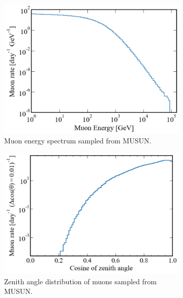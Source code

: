 \begin{figure}[htbp]
    \centering
    \begin{subfigure}[b]{0.48\textwidth}
        \centering
        \includegraphics[width=\textwidth]{figures/Muons/Primary_energyLZstyle.pdf}
        \caption{Muon energy spectrum sampled from MUSUN.}
        \label{fig:Muons/Prim_E}
    \end{subfigure}
    \begin{subfigure}[b]{0.49\textwidth}  
        \centering 
        \includegraphics[width=\textwidth]{figures/Muons/cosZ_LZstyle.pdf}
        \caption{Zenith angle distribution of muons sampled from MUSUN.}
        \label{fig:Muons/cosZ}
    \end{subfigure}
    \begin{subfigure}[b]{0.49\textwidth}   

\end{subfigure}
\end{figure}
